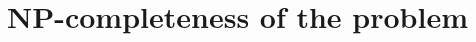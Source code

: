 \documentclass{article}
\begin{document}
\section{NP-completeness of the problem}


 


\begin{thebibliography}{1}



\end{thebibliography}
\end{document}

